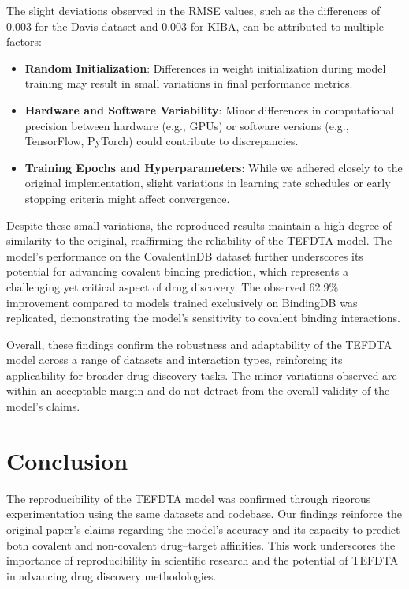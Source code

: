 \documentclass{article}
\begin{document}
The slight deviations observed in the RMSE values, such as the differences of 0.003 for the Davis dataset and 0.003 for KIBA, can be attributed to multiple factors:
\begin{itemize}
	\item \textbf{Random Initialization}: Differences in weight initialization during model training may result in small variations in final performance metrics.
	\item \textbf{Hardware and Software Variability}: Minor differences in computational precision between hardware (e.g., GPUs) or software versions (e.g., TensorFlow, PyTorch) could contribute to discrepancies.
	\item \textbf{Training Epochs and Hyperparameters}: While we adhered closely to the original implementation, slight variations in learning rate schedules or early stopping criteria might affect convergence.
\end{itemize}

Despite these small variations, the reproduced results maintain a high degree of similarity to the original, reaffirming the reliability of the TEFDTA model. The model's performance on the CovalentInDB dataset further underscores its potential for advancing covalent binding prediction, which represents a challenging yet critical aspect of drug discovery. The observed 62.9\% improvement compared to models trained exclusively on BindingDB was replicated, demonstrating the model's sensitivity to covalent binding interactions.

Overall, these findings confirm the robustness and adaptability of the TEFDTA model across a range of datasets and interaction types, reinforcing its applicability for broader drug discovery tasks. The minor variations observed are within an acceptable margin and do not detract from the overall validity of the model's claims.

\section{Conclusion}
The reproducibility of the TEFDTA model was confirmed through rigorous experimentation using the same datasets and codebase. Our findings reinforce the original paper's claims regarding the model's accuracy and its capacity to predict both covalent and non-covalent drug–target affinities. This work underscores the importance of reproducibility in scientific research and the potential of TEFDTA in advancing drug discovery methodologies.
\end{document}
